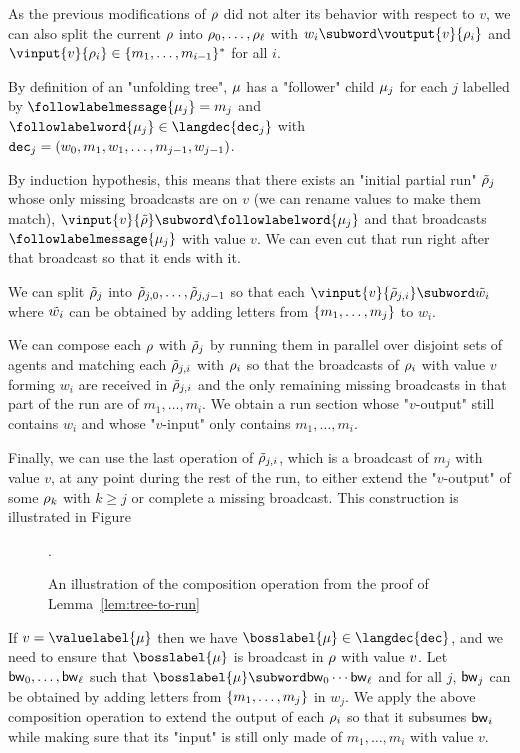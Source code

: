 As the previous modifications of $\rho$ did not alter its behavior with respect to $v$, we can also split the current $\rho$ into $\rho_0, \ldots, \rho_\ell$ with $w_i \subword \voutput{\aval}{\run_i}$ and $\vinput{\aval}{\run_i} \in \set{m_1, \dots, m_{i-1}}^*$ for all $i$. 

By definition of an "unfolding tree", $\mu$ has a "follower" child $\mu_j$ for each $j$ labelled by $\followlabelmessage{\node_j} = m_j$ and $\followlabelword{\node_j} \in \langdec{\decsymb_j}$ with $\mathtt{dec}_j = (w_0, m_1, w_1, \ldots, m_{j-1}, w_{j-1})$. 

By induction hypothesis, this means that there exists an "initial partial run" $\Tilde{\rho}_j$ whose only missing broadcasts are on $v$ (we can rename values to make them match), $\vinput{v}{\Tilde{\run}} \subword \followlabelword{\node_{j}}$ and that broadcasts $\followlabelmessage{\node_{j}}$ with value $v$. We can even cut that run right after that broadcast so that it ends with it. 

We can split $\Tilde{\rho}_j$ into $\Tilde{\rho}_{j, 0}, \ldots, \Tilde{\rho}_{j,j-1}$ so that each  $\vinput{v}{\Tilde{\run}_{j, i}} \subword \Tilde{w_i}$ where $\Tilde{w_i}$ can be obtained by adding letters from $\{m_1, \ldots, m_j\}$ to $w_i$.

We can compose each $\rho$ with $\Tilde{\rho}_{j}$ by running them in parallel over disjoint sets of agents and matching each $\Tilde{\rho}_{j, i}$ with $\rho_i$ so that the broadcasts of $\rho_i$ with value $v$ forming $w_i$ are received in $\Tilde{\rho}_{j, i}$ and the only remaining missing broadcasts in that part of the run are of $m_1, \ldots, m_i$.
We obtain a run section whose "$v$-output" still contains $w_i$ and whose "$v$-input" only contains $m_1, \ldots, m_i$. 

Finally, we can use the last operation of $\Tilde{\rho}_{j, i}$, which is a broadcast of $m_j$ with value $v$, at any point during the rest of the run, to either extend the "$v$-output" of some $\rho_k$ with $k \geq j$ or complete a missing broadcast.
This construction is illustrated in Figure
\begin{figure}
	
	\caption{An illustration of the composition operation from the proof of Lemma~\ref{lem:tree-to-run}}.
	\label{fig:tree-to-run}
\end{figure}
If $\val = \valuelabel{\node}$ then we have $\bosslabel{\node} \in \langdec{\decsymb}$, and we need to ensure that $\bosslabel{\node}$ is broadcast in $\rho$ with value $v$.
Let $\mathsf{bw}_0, \ldots, \mathsf{bw}_\ell$ such that $\bosslabel{\node} \subword \bossspec_0\cdots\bossspec_\ell$ and for all $j$, $\mathsf{bw}_j$ can be obtained by adding letters from $\{m_1,\ldots, m_j\}$ in $w_j$.
We apply the above composition operation to extend the output of each $\rho_{i}$ so that it subsumes $\mathsf{bw}_i$ while making sure that its "input" is still only made of $m_1, \ldots, m_i$ with value $v$. 

